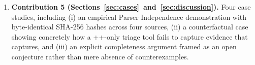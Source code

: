 \begin{enumerate}
    \item \textbf{Contribution 5 (Sections~\ref{sec:cases}~and~\ref{sec:discussion}).}
    Four case studies, including (i) an empirical Parser Independence
    demonstration with byte-identical SHA-256 hashes across four sources,
    (ii) a counterfactual case showing concretely how a ++-only
    triage tool fails to capture evidence that  captures, and (iii)
    an explicit completeness argument framed as an open conjecture rather
    than mere absence of counterexamples.
\end{enumerate}

